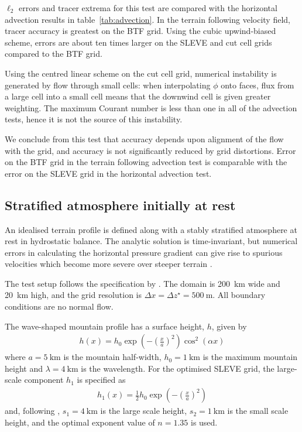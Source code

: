 \documentclass[draft]{ametsoc}
\begin{document}
$\ell_2$ errors and tracer extrema for this test are compared with the horizontal advection results in table~\ref{tab:advection}.  In the terrain following velocity field, tracer accuracy is greatest on the BTF grid.  Using the cubic upwind-biased scheme, errors are about ten times larger on the SLEVE and cut cell grids compared to the BTF grid.

Using the centred linear scheme on the cut cell grid, numerical instability is generated by flow through small cells: when interpolating \(\phi\) onto faces, flux from a large cell into a small cell means that the downwind cell is given greater weighting.  The maximum Courant number is less than one in all of the advection tests, hence it is not the source of this instability.

We conclude from this test that accuracy depends upon alignment of the flow with the grid, and accuracy is not significantly reduced by grid distortions.  Error on the BTF grid in the terrain following advection test is comparable with the error on the SLEVE grid in the horizontal advection test.

\subsection{Stratified atmosphere initially at rest}
\label{sec:resting}

An idealised terrain profile is defined along with a stably stratified atmosphere at rest in hydrostatic balance.  The analytic solution is time-invariant, but numerical errors in calculating the horizontal pressure gradient can give rise to spurious velocities which become more severe over steeper terrain \citep{klemp2011}.

The test setup follows the specification by \cite{klemp2011}.  The domain is \SI{200}{\kilo\meter} wide and \SI{20}{\kilo\meter} high, and the grid resolution is \(\Delta x = \Delta z^\star = \SI{500}{\meter}\).  All boundary conditions are no normal flow.

The wave-shaped mountain profile has a surface height, $h$, given by
\begin{align}
	h(x) = h_0 \exp \left( - \left( \frac{x}{a} \right)^2 \right) \cos^2 \left( \alpha x \right) \label{eqn:resting:mountain}
\end{align}
where $a = \SI{5}{\kilo\meter}$ is the mountain half-width, $h_0 = \SI{1}{\kilo\meter}$ is the maximum mountain height and $\lambda = \SI{4}{\kilo\meter}$ is the wavelength.  For the optimised SLEVE grid, the large-scale component $h_1$ is specified as
\begin{align}
h_1(x) = \frac{1}{2} h_0 \exp \left( - \left( \frac{x}{a} \right)^2 \right)
\end{align}
and, following \cite{leuenberger2010}, $s_1 = \SI{4}{\kilo\meter}$ is the large scale height, $s_2 = \SI{1}{\kilo\meter}$ is the small scale height, and the optimal exponent value of $n = 1.35$ is used.
\end{document}
